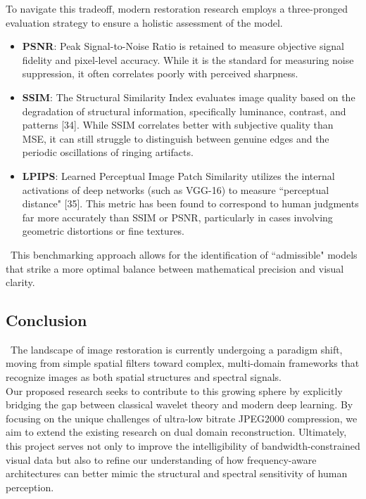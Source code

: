 \documentclass[12pt]{article}
\begin{document}
To navigate this tradeoff, modern restoration research employs a three-pronged evaluation strategy to ensure a holistic assessment of the model.

\begin{itemize}
    \item \textbf{PSNR}: Peak Signal-to-Noise Ratio is retained to measure objective signal fidelity and pixel-level accuracy. While it is the standard for measuring noise suppression, it often correlates poorly with perceived sharpness.
    \item \textbf{SSIM}: The Structural Similarity Index evaluates image quality based on the degradation of structural information, specifically luminance, contrast, and patterns [34]. While SSIM correlates better with subjective quality than MSE, it can still struggle to distinguish between genuine edges and the periodic oscillations of ringing artifacts.
    \item \textbf{LPIPS}: Learned Perceptual Image Patch Similarity utilizes the internal activations of deep networks (such as VGG-16) to measure ``perceptual distance" [35]. This metric has been found to correspond to human judgments far more accurately than SSIM or PSNR, particularly in cases involving geometric distortions or fine textures.
\end{itemize}

\quad \, This benchmarking approach allows for the identification of ``admissible" models that strike a more optimal balance between mathematical precision and visual clarity.

\subsection*{Conclusion}

\quad \, The landscape of image restoration is currently undergoing a paradigm shift, moving from simple spatial filters toward complex, multi-domain frameworks that recognize images as both spatial structures and spectral signals. \\

Our proposed research seeks to contribute to this growing sphere by explicitly bridging the gap between classical wavelet theory and modern deep learning. By focusing on the unique challenges of ultra-low bitrate JPEG2000 compression, we aim to extend the existing research on dual domain reconstruction. Ultimately, this project serves not only to improve the intelligibility of bandwidth-constrained visual data but also to refine our understanding of how frequency-aware architectures can better mimic the structural and spectral sensitivity of human perception.
\end{document}
